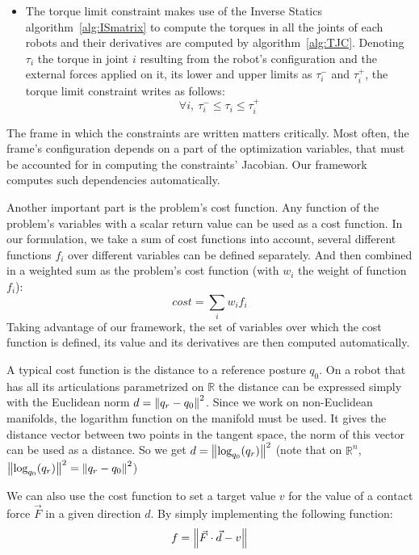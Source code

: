 \begin{itemize}
\begin{equation}
  \end{equation}
\item The torque limit constraint makes use of the Inverse Statics algorithm~\ref{alg:ISmatrix} to compute the torques in all the joints of each robots and their derivatives are computed by algorithm~\ref{alg:TJC}.
  Denoting $\tau_i$ the torque in joint $i$ resulting from the robot's configuration and the external forces applied on it, its lower and upper limits as $\tau_i^-$ and $\tau_i^+$, the torque limit constraint writes as follows:
  \begin{equation}
    \forall i,\ \tau_i^- \leq \tau_i \leq \tau_i^+
  \end{equation}
\end{itemize}

The frame in which the constraints are written matters critically.
Most often, the frame's configuration depends on a part of the optimization variables, that must be accounted for in computing the constraints' Jacobian.
Our framework computes such dependencies automatically.

Another important part is the problem's cost function.
Any function of the problem's variables with a scalar return value can be used as a cost function.
In our formulation, we take a sum of cost functions into account, several different functions $f_i$ over different variables can be defined separately.
And then combined in a weighted sum as the problem's cost function (with $w_i$ the weight of function $f_i$):
\begin{equation}
  cost = \sum\limits_i w_i f_i
\end{equation}
Taking advantage of our framework, the set of variables over which the cost function is defined, its value and its derivatives are then computed automatically.

A typical cost function is the distance to a reference posture $q_0$.
On a robot that has all its articulations parametrized on $\mathbb{R}$ the distance can be expressed simply with the Euclidean norm $d = \left\| q_r-q_0 \right\|^2$.
Since we work on non-Euclidean manifolds, the logarithm function on the manifold must be used.
It gives the distance vector between two points in the tangent space, the norm of this vector can be used as a distance.
So we get $d = \left\| \text{log}_{q_0}(q_r) \right\|^2$ (note that on $\mathbb{R}^n$, $\left\| \text{log}_{q_0}(q_r) \right\|^2 = \left\| q_r - q_0 \right\|^2$)

We can also use the cost function to set a target value $v$ for the value of a contact force $\vec{F}$ in a given direction $d$. By simply implementing the following function:
\begin{equation}
  f = \left\| \vec{F}\cdot\vec{d}-v \right\|
\end{equation}

